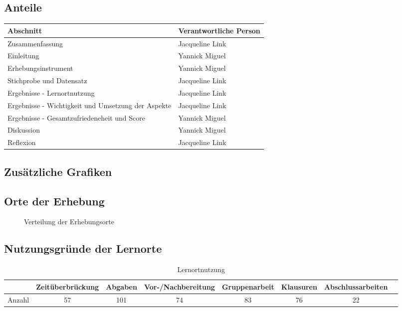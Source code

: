 \documentclass[11pt, a4paper]{article}
\begin{document}
\subsection{Anteile}
\begin{table}[h]
	\begin{tabular}{l|l}
		Abschnitt                                          & Verantwortliche Person \\ \hline
		Zusammenfassung                                    & Jacqueline Link        \\
		Einleitung                                         & Yannick Miguel         \\
		Erhebungsinstrument                                & Yannick Miguel         \\
		Stichprobe und Datensatz                           &
		Jacqueline Link        \\
		Ergebnisse - Lernortnutzung                        & Jacqueline Link        \\
		Ergebnisse - Wichtigkeit und Umsetzung der Aspekte & Jacqueline Link        \\
		Ergebnisse - Gesamtzufriedeneheit und Score        & Yannick Miguel         \\
		Diskussion                                         & Yannick Miguel         \\
		Reflexion                                          & Jacqueline Link       
	\end{tabular}
\end{table}
\subsection{Zusätzliche Grafiken}
\vspace{0.22cm}
\subsection*{Orte der Erhebung}
\begin{figure}[h]
	\centering
	
	\caption{Verteilung der Erhebungsorte}
\end{figure}
\subsection*{Nutzungsgründe der Lernorte}
\begin{table}[h]
	\begin{tabular}{c|ccccccc}
		& Zeitüberbrückung & Abgaben & Vor-/Nachbereitung & Gruppenarbeit & Klausuren & Abschlussarbeiten \\ \hline
		Anzahl & 57            & 101             & 74                          & 83                     & 76                 & 22                      
	\end{tabular}
	\caption{Lernortnutzung}
\end{table}
\newpage
\end{document}
